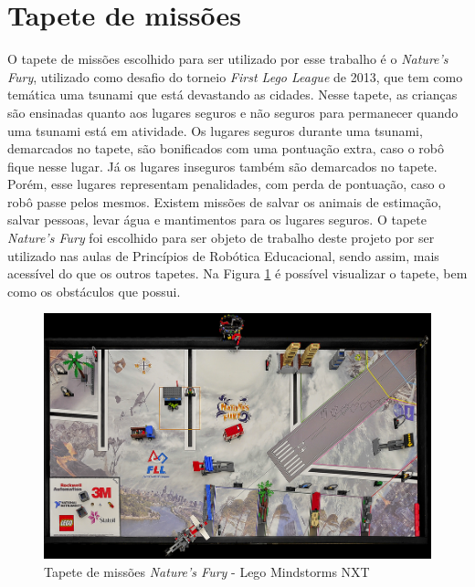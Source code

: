 \section{Tapete de missões} \label{tapeteDeMissoes}
O tapete de missões escolhido para ser utilizado por esse trabalho é o \textit{Nature's Fury}, utilizado como desafio do torneio \textit{First Lego League} de 2013, que tem como temática uma tsunami que está devastando as cidades. Nesse tapete, as crianças são ensinadas quanto aos lugares seguros e não seguros para permanecer quando uma tsunami está em atividade. Os lugares seguros durante uma tsunami, demarcados no tapete, são bonificados com uma pontuação extra, caso o robô fique nesse lugar. Já os lugares inseguros também são demarcados no tapete. Porém, esse lugares representam penalidades, com perda de pontuação, caso o robô passe pelos mesmos. Existem missões de salvar os animais de estimação, salvar pessoas, levar água e mantimentos para os lugares seguros.
O tapete \textit{Nature's Fury} foi escolhido para ser objeto de trabalho deste projeto por ser utilizado nas aulas de Princípios de Robótica Educacional, sendo assim, mais acessível do que os outros tapetes. Na Figura \ref{natureFury} é possível visualizar o tapete, bem como os obstáculos que possui. 

\FloatBarrier
\begin{figure}[!h]
\centering
\includegraphics[keepaspectratio=true,scale=0.5]{figuras/natureFury.png}
\caption{Tapete de missões \textit{Nature's Fury} - Lego Mindstorms NXT}
\label{natureFury}
\end{figure}

 
